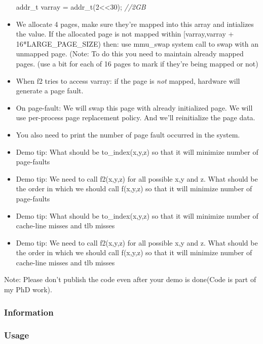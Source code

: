 \documentclass[]{book}
\newenvironment{Shaded}{}{}
\newcommand{\DecValTok}[1]{\textcolor[rgb]{0.00,0.00,1.00}{{#1}}}
\newcommand{\CommentTok}[1]{\textcolor[rgb]{0.50,0.50,0.50}{\textit{{#1}}}}
\newcommand{\NormalTok}[1]{{#1}}
\begin{document}
\begin{itemize}
\begin{Shaded}
\begin{Highlighting}[]
\NormalTok{addr_t varray = addr_t(}\DecValTok{2}\NormalTok{<<}\DecValTok{30}\NormalTok{); }\CommentTok{//2GB}
\end{Highlighting}
\end{Shaded}
\item
  We allocate 4 pages, make sure they're mapped into this array and
  intializes the value. If the allocated page is not mapped within
  {[}varray,varray + 16*LARGE\_PAGE\_SIZE) then: use mmu\_swap system
  call to swap with an unmapped page. (Note: To do this you need to
  maintain already mapped pages. (use a bit for each of 16 pages to mark
  if they're being mapped or not)
\item
  When f2 tries to access varray: if the page is \emph{not} mapped,
  hardware will generate a page fault.
\item
  On page-fault: We will swap this page with already initialized page.
  We will use per-process page replacement policy. And we'll
  reinitialize the page data.
\item
  You also need to print the number of page fault occurred in the
  system.
\item
  Demo tip: What should be to\_index(x,y,z) so that it will minimize
  number of page-faults
\item
  Demo tip: We need to call f2(x,y,z) for all possible x,y and z. What
  should be the order in which we should call f(x,y,z) so that it will
  minimize number of page-faults
\item
  Demo tip: What should be to\_index(x,y,z) so that it will minimize
  number of cache-line misses and tlb misses
\item
  Demo tip: We need to call f2(x,y,z) for all possible x,y and z. What
  should be the order in which we should call f(x,y,z) so that it will
  minimize number of cache-line misses and tlb misses
\end{itemize}

Note: Please don't publish the code even after your demo is done(Code is
part of my PhD work).

\subsubsection*{Information}\label{information-13}

\subsubsection*{Usage}\label{usage-13}
\end{document}
